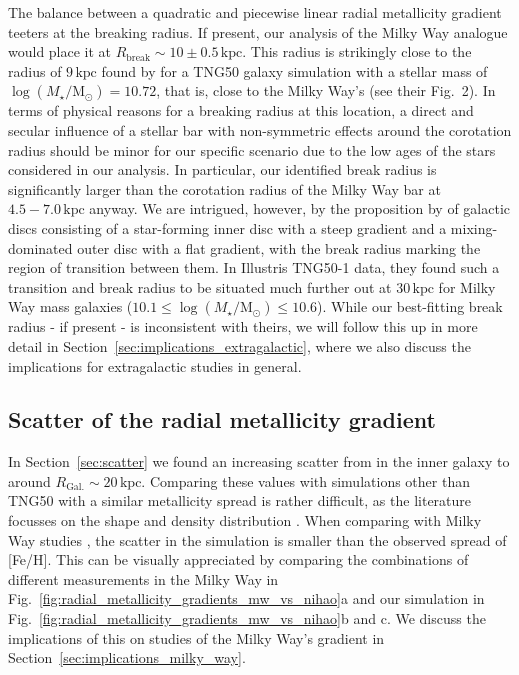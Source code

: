 \documentclass[twocolumn,apj,numberedappendix,appendixfloats]{openjournal}
\begin{document}
\begin{CJK*}{UTF8}{gbsn}
The balance between a quadratic and piecewise linear radial metallicity gradient teeters at the breaking radius. If present, our analysis of the Milky Way analogue would place it at $R_\mathrm{break} \sim 10 \pm 0.5\,\mathrm{kpc}$. This radius is strikingly close to the radius of $9\,\mathrm{kpc}$ found by \citet{Hemler2021} for a TNG50 galaxy simulation with a stellar mass of $\log(M_\star/\mathrm{M_\odot}) = 10.72$, that is, close to the Milky Way's (see their Fig.~2). In terms of physical reasons for a breaking radius at this location, a direct and secular influence of a stellar bar with non-symmetric effects around the corotation radius \citep{DiMatteo2013, Scarano2013} should be minor for our specific scenario due to the low ages of the stars considered in our analysis. In particular, our identified break radius is significantly larger than the corotation radius of the Milky Way bar at $4.5-7.0\,\mathrm{kpc}$ \citep[][and references therein]{BlandHawthorn_Gerhard2016} anyway. We are intrigued, however, by the proposition by \citet{Garcia2023} of galactic discs consisting of a star-forming inner disc with a steep gradient and a mixing-dominated outer disc with a flat gradient, with the break radius marking the region of transition between them. In Illustris TNG50-1 data, they found such a transition and break radius to be situated much further out at $30\,\mathrm{kpc}$ for Milky Way mass galaxies ($10.1 \leq \log(M_\star/\mathrm{M_\odot}) \leq 10.6$). While our best-fitting break radius - if present - is inconsistent with theirs, we will follow this up in more detail in Section~\ref{sec:implications_extragalactic}, where we also discuss the implications for extragalactic studies in general.

\subsection{Scatter of the radial metallicity gradient} \label{sec:discussion_scatter}

In Section~\ref{sec:scatter} we found an increasing scatter from  in the inner galaxy to  around $R_\mathrm{Gal.} \sim 20\,\mathrm{kpc}$. Comparing these values with simulations other than TNG50 with a similar metallicity spread \citep[see Fig.~2 by][]{Hemler2021} is rather difficult, as the literature focusses on the shape and density distribution \citep[see e.g.][their Fig.~10]{Minchev2014b}. When comparing with Milky Way studies \citep[e.g.][]{Anders2017}, the scatter in the simulation is smaller than the observed spread of [Fe/H]. This can be visually appreciated by comparing the combinations of different measurements in the Milky Way \citep{Genovali2014, Spina2021, Myers2022} in Fig.~\ref{fig:radial_metallicity_gradients_mw_vs_nihao}a and our simulation in Fig.~\ref{fig:radial_metallicity_gradients_mw_vs_nihao}b and c. We discuss the implications of this on studies of the Milky Way's gradient in Section~\ref{sec:implications_milky_way}.


\end{CJK*}
\end{document}
